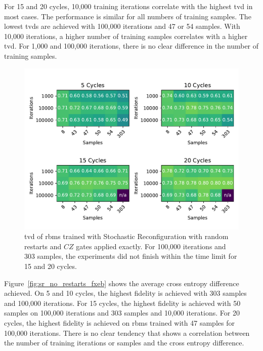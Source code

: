 For 15 and 20 cycles, 10,000 training iterations correlate with the highest \gls{tvd} in most cases.
The performance is similar for all numbers of training samples. The lowest \gls{tvd}s are achieved with 100,000
iterations and 47 or 54 samples. With 10,000 iterations, a higher number of training samples correlates 
with a higher \gls{tvd}. For 1,000 and 100,000 iterations, there is no clear difference in the number of training 
samples.

\begin{figure}[H]
  \centering
  \includegraphics[width=\textwidth]{figures/results/sr-restarts-not-learned/tvd_heatmap.pdf}
  \caption[TVD of RBMs Trained with Stochastic Reconfiguration with Random Restarts and $CZ$ Gates Applied Exactly]{
  \gls{tvd} of \gls{rbm}s trained with Stochastic Reconfiguration with random restarts and $CZ$ gates applied exactly.
  For 100,000 iterations and 303 samples, the experiments did not finish within the time limit for 15 and 20 cycles.}
  \label{fig:sr_exact_tvd}
\end{figure}

Figure~\ref{fig:sr_no_restarts_fxeb} shows the average cross entropy difference achieved. On 5 and 10
cycles, the highest fidelity is achieved with 303 samples and 100,000 iterations. 
For 15 cycles, the highest fidelity is achieved with 50 samples on 100,000 iterations and 
303 samples and 10,000 iterations.
For 20 cycles, the highest fidelity is achieved on \gls{rbm}s trained with 47 samples for 100,000 iterations.
There is no clear tendency that shows a correlation between 
the number of training iterations or samples and the cross entropy difference.

